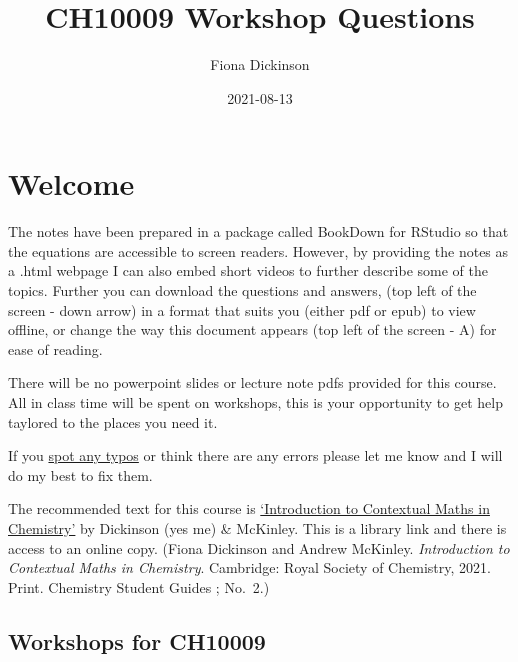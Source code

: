 \documentclass[
]{book}
\title{CH10009 Workshop Questions}
\author{Fiona Dickinson}
\date{2021-08-13}
\begin{document}
\maketitle

{
\setcounter{tocdepth}{1}
\tableofcontents
}
\hypertarget{welcome}{%
\chapter*{Welcome}\label{welcome}}

The notes have been prepared in a package called BookDown for RStudio so that the equations are accessible to screen readers. However, by providing the notes as a .html webpage I can also embed short videos to further describe some of the topics. Further you can download the questions and answers, (top left of the screen - down arrow) in a format that suits you (either pdf or epub) to view offline, or change the way this document appears (top left of the screen - A) for ease of reading.

There will be no powerpoint slides or lecture note pdfs provided for this course. All in class time will be spent on workshops, this is your opportunity to get help taylored to the places you need it.

If you \href{https://docs.google.com/forms/d/1hxCt8XcQ8taLXfymZfl2LUOjHACQ4INnRK6GeArTxsc/edit}{spot any typos} or think there are any errors please let me know and I will do my best to fix them.

The recommended text for this course is \href{https://bath-ac-primo.hosted.exlibrisgroup.com/primo-explore/fulldisplay?docid=44BAT_ALMA_DS51100784580002761\&context=L\&vid=44BAT_VU1\&lang=en_US\&search_scope=CSCOP_44BAT_DEEP\&adaptor=Local\%20Search\%20Engine\&tab=local\&query=any,contains,contextual\%20maths\%20in\%20chemistry\&sortby=rank\&pcAvailability=false}{`Introduction to Contextual Maths in Chemistry'} by Dickinson (yes me) \& McKinley. This is a library link and there is access to an online copy. (Fiona Dickinson and Andrew McKinley. \emph{Introduction to Contextual Maths in Chemistry}. Cambridge: Royal Society of Chemistry, 2021. Print. Chemistry Student Guides ; No.~2.)

\hypertarget{workshops-for-ch10009}{%
\section*{Workshops for CH10009}\label{workshops-for-ch10009}}
\end{document}
